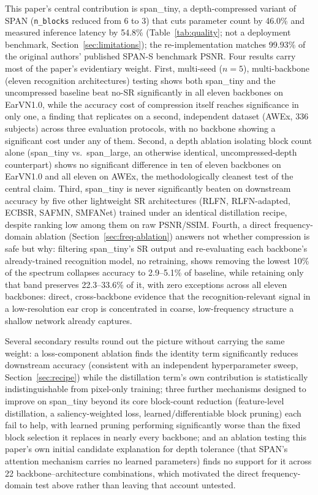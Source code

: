 \documentclass[pdflatex,sn-vancouver-num]{sn-jnl}
\begin{document}
This paper's central contribution is span\_tiny, a depth-compressed variant of SPAN (\texttt{n\_blocks} reduced from 6 to 3) that cuts parameter count by 46.0\% and measured inference latency by 54.8\% (Table~\ref{tab:quality}; not a deployment benchmark, Section~\ref{sec:limitations}); the re-implementation matches 99.93\% of the original authors' published SPAN-S benchmark PSNR. Four results carry most of the paper's evidentiary weight. First, multi-seed ($n=5$), multi-backbone (eleven recognition architectures) testing shows both span\_tiny and the uncompressed baseline beat no-SR significantly in all eleven backbones on EarVN1.0, while the accuracy cost of compression itself reaches significance in only one, a finding that replicates on a second, independent dataset (AWEx, 336 subjects) across three evaluation protocols, with no backbone showing a significant cost under any of them. Second, a depth ablation isolating block count alone (span\_tiny vs.\ span\_large, an otherwise identical, uncompressed-depth counterpart) shows no significant difference in ten of eleven backbones on EarVN1.0 and all eleven on AWEx, the methodologically cleanest test of the central claim. Third, span\_tiny is never significantly beaten on downstream accuracy by five other lightweight SR architectures (RLFN, RLFN-adapted, ECBSR, SAFMN, SMFANet) trained under an identical distillation recipe, despite ranking low among them on raw PSNR/SSIM. Fourth, a direct frequency-domain ablation (Section~\ref{sec:freq-ablation}) answers not whether compression is safe but why: filtering span\_tiny's SR output and re-evaluating each backbone's already-trained recognition model, no retraining, shows removing the lowest 10\% of the spectrum collapses accuracy to 2.9--5.1\% of baseline, while retaining only that band preserves 22.3--33.6\% of it, with zero exceptions across all eleven backbones: direct, cross-backbone evidence that the recognition-relevant signal in a low-resolution ear crop is concentrated in coarse, low-frequency structure a shallow network already captures.

Several secondary results round out the picture without carrying the same weight: a loss-component ablation finds the identity term significantly reduces downstream accuracy (consistent with an independent hyperparameter sweep, Section~\ref{sec:recipe}) while the distillation term's own contribution is statistically indistinguishable from pixel-only training; three further mechanisms designed to improve on span\_tiny beyond its core block-count reduction (feature-level distillation, a saliency-weighted loss, learned/differentiable block pruning) each fail to help, with learned pruning performing significantly worse than the fixed block selection it replaces in nearly every backbone; and an ablation testing this paper's own initial candidate explanation for depth tolerance (that SPAN's attention mechanism carries no learned parameters) finds no support for it across 22 backbone--architecture combinations, which motivated the direct frequency-domain test above rather than leaving that account untested.
\end{document}
